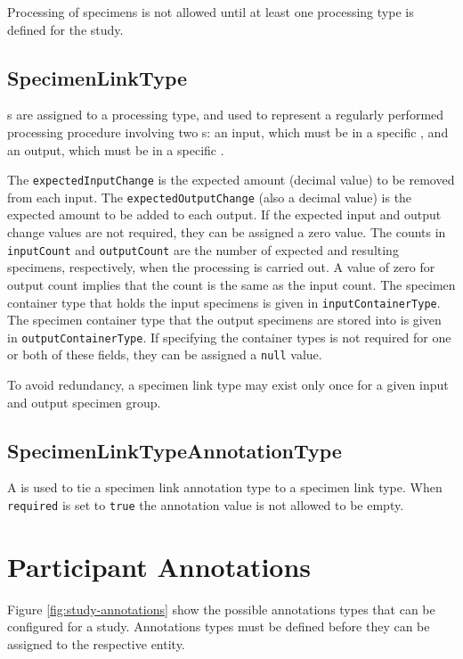Processing of specimens is not allowed until at least one processing type is
defined for the study.

\subsection*{SpecimenLinkType}

 s are assigned to
a processing type, and used to represent a regularly performed processing
procedure involving two s: an input, which must be in a
specific , and an output, which must be in a specific
.

The \texttt{expectedInputChange} is the expected amount (decimal value) to be
removed from each input. The \texttt{expectedOutputChange} (also a decimal
value) is the expected amount to be added to each output. If the expected input
and output change values are not required, they can be assigned a zero value.
The counts in \texttt{inputCount} and \texttt{outputCount} are the number of
expected and resulting specimens, respectively, when the processing is carried
out. A value of zero for output count implies that the count is the same as the
input count. The specimen container type that holds the input specimens is
given in \texttt{inputContainerType}. The specimen container type that the
output specimens are stored into is given in \texttt{outputContainerType}. If
specifying the container types is not required for one or both of these fields,
they can be assigned a \texttt{null} value.

To avoid redundancy, a specimen link type may exist only once for a given input
and output specimen group.

\subsection*{SpecimenLinkTypeAnnotationType}

A  is used to tie a specimen
link annotation type to a specimen link type. When \texttt{required} is set to
\texttt{true} the annotation value is not allowed to be empty.

\section{Participant Annotations}
\label{sec:participant-annotations}

Figure \ref{fig:study-annotations} show the possible annotations types that can
be configured for a study. Annotations types must be defined before they can be
assigned to the respective entity.

